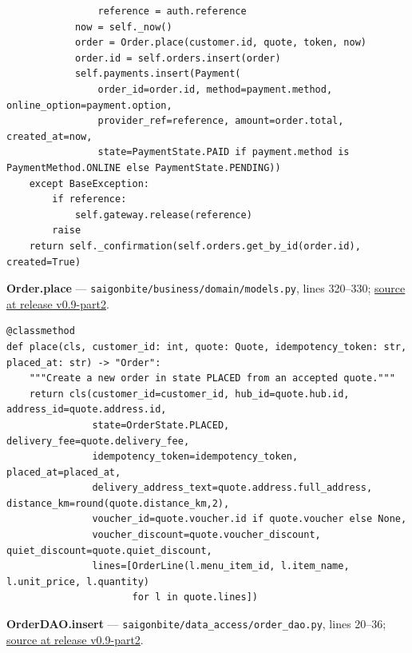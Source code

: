 \begin{lstlisting}
                reference = auth.reference
            now = self._now()
            order = Order.place(customer.id, quote, token, now)
            order.id = self.orders.insert(order)
            self.payments.insert(Payment(
                order_id=order.id, method=payment.method, online_option=payment.option,
                provider_ref=reference, amount=order.total, created_at=now,
                state=PaymentState.PAID if payment.method is PaymentMethod.ONLINE else PaymentState.PENDING))
    except BaseException:
        if reference:
            self.gateway.release(reference)
        raise
    return self._confirmation(self.orders.get_by_id(order.id), created=True)
\end{lstlisting}
\textbf{Order.place} --- \texttt{saigonbite/\allowbreak{}business/\allowbreak{}domain/\allowbreak{}models.\allowbreak{}py}, lines 320--330; \href{\TargetRepo\detokenize{/blob/v0.9-part2/saigonbite/business/domain/models.py#L320-L330}}{source at release v0.9-part2}.

\begin{lstlisting}
@classmethod
def place(cls, customer_id: int, quote: Quote, idempotency_token: str, placed_at: str) -> "Order":
    """Create a new order in state PLACED from an accepted quote."""
    return cls(customer_id=customer_id, hub_id=quote.hub.id, address_id=quote.address.id,
               state=OrderState.PLACED, delivery_fee=quote.delivery_fee,
               idempotency_token=idempotency_token, placed_at=placed_at,
               delivery_address_text=quote.address.full_address, distance_km=round(quote.distance_km,2),
               voucher_id=quote.voucher.id if quote.voucher else None,
               voucher_discount=quote.voucher_discount, quiet_discount=quote.quiet_discount,
               lines=[OrderLine(l.menu_item_id, l.item_name, l.unit_price, l.quantity)
                      for l in quote.lines])
\end{lstlisting}
\textbf{OrderDAO.insert} --- \texttt{saigonbite/\allowbreak{}data\_\allowbreak{}access/\allowbreak{}order\_\allowbreak{}dao.\allowbreak{}py}, lines 20--36; \href{\TargetRepo\detokenize{/blob/v0.9-part2/saigonbite/data_access/order_dao.py#L20-L36}}{source at release v0.9-part2}.

